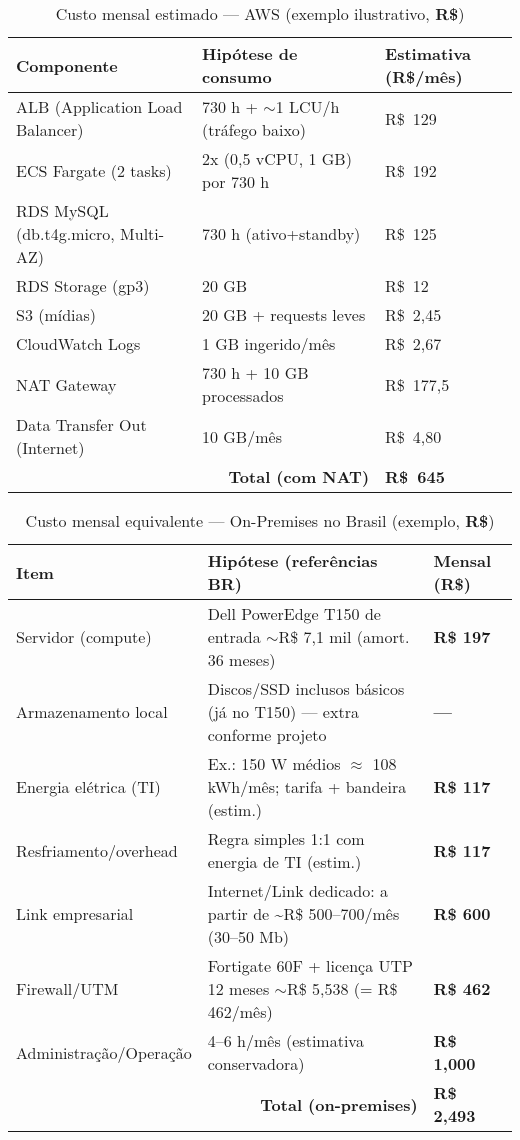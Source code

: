 \begin{table}[H]
\centering
\caption{Custo mensal estimado — AWS (exemplo ilustrativo, \textbf{R\$})}
\label{tab:custo-aws-brl}
\begin{tabular}{|p{5cm}|p{7cm}|p{4cm}|}
\hline
\textbf{Componente} & \textbf{Hipótese de consumo} & \textbf{Estimativa (R\$/mês)} \\
\hline
ALB (Application Load Balancer) & 730 h + \(\sim\)1 LCU/h (tráfego baixo) & R\$~129 \\
\hline
ECS Fargate (2 tasks) & 2x (0{,}5 vCPU, 1 GB) por 730 h & R\$~192 \\
\hline
RDS MySQL (db.t4g.micro, Multi-AZ) & 730 h (ativo+standby) & R\$~125 \\
\hline
RDS Storage (gp3) & 20 GB & R\$~12 \\
\hline
S3 (mídias) & 20 GB + requests leves & R\$~2{,}45 \\
\hline
CloudWatch Logs & 1 GB ingerido/mês & R\$~2{,}67 \\
\hline
NAT Gateway & 730 h + 10 GB processados & R\$~177{,}5 \\
\hline
Data Transfer Out (Internet) & 10 GB/mês & R\$~4{,}80 \\
\hline
\multicolumn{2}{|r|}{\textbf{Total (com NAT)}} & \textbf{R\$~645} \\
\hline
\end{tabular}
\end{table}



\begin{table}[H]
\centering
\caption{Custo mensal equivalente — On-Premises no Brasil (exemplo, \textbf{R\$})}
\label{tab:custo-onprem-brl}
\begin{tabular}{|p{5cm}|p{7cm}|p{4cm}|}
\hline
\textbf{Item} & \textbf{Hipótese (referências BR)} & \textbf{Mensal (R\$)} \\
\hline
Servidor (compute) & Dell PowerEdge T150 de entrada \(\sim\)R\$ 7{,}1 mil (amort. 36 meses) & \textbf{R\$ 197} \\
\hline
Armazenamento local & Discos/SSD inclusos básicos (já no T150) — extra conforme projeto & \textbf{—} \\
\hline
Energia elétrica (TI) & Ex.: 150 W médios \(\approx\) 108 kWh/mês; tarifa + bandeira (estim.) & \textbf{R\$ 117} \\
\hline
Resfriamento/overhead & Regra simples 1:1 com energia de TI (estim.) & \textbf{R\$ 117} \\
\hline
Link empresarial & Internet/Link dedicado: a partir de \textasciitilde R\$ 500–700/mês (30–50 Mb) & \textbf{R\$ 600} \\
\hline
Firewall/UTM & Fortigate 60F + licença UTP 12 meses \(\sim\)R\$ 5{,}538 (= R\$ 462/mês) & \textbf{R\$ 462} \\
\hline
Administração/Operação & 4–6 h/mês (estimativa conservadora) & \textbf{R\$ 1{,}000} \\
\hline
\multicolumn{2}{|r|}{\textbf{Total (on-premises)}} & \textbf{R\$ 2{,}493} \\
\hline
\end{tabular}
\end{table}



